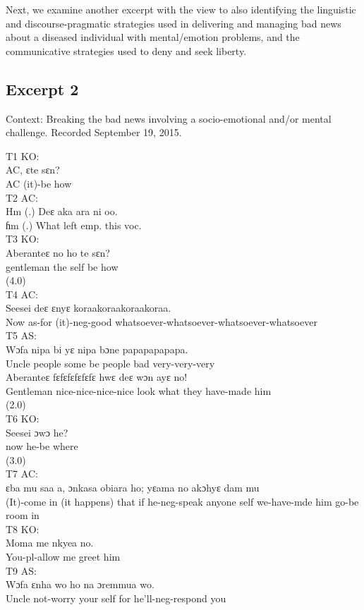 \documentclass[output=paper,colorlinks,citecolor=brown]{langscibook}
\begin{document}
Next, we examine another excerpt with the view to also identifying the linguistic and discourse-pragmatic strategies used in delivering and managing bad news about a diseased individual with mental/emotion problems, and the communicative strategies used to deny and seek liberty.

\subsection{Excerpt 2}\label{sec:obeng:4.2}
Context: Breaking the bad news involving a socio-emotional and/or mental challenge. Recorded September 19, 2015.

\ea
    T1 KO:\\
    \gll    AC, ɛte sɛn?\\
            AC (it)-be how \\
\ex
    T2 AC:\\
    \gll    Hm (.) Deɛ aka ara ni oo. \\
            ɦm (.) What left emp. this voc.\\
\ex
    T3 KO:\\ 
    \gll    Aberanteɛ no ho te sɛn? \\
            gentleman the self be how\\
            (4.0)\\
\ex
    T4 AC:\\
    \gll    Seesei deɛ ɛnyɛ koraakoraakoraakoraa. \\
            Now as-for (it)-neg-good whatsoever-whatsoever-whatsoever-whatsoever\\
\ex
    T5 AS:\\
    \ea
    \gll    Wɔfa nipa bi yɛ nipa bɔne papapapapapa. \\
            Uncle people some be people bad very-very-very \\
    \ex
    \gll    Aberanteɛ fɛfɛfɛfɛfɛfɛ hwɛ deɛ wɔn ayɛ no! \\
            Gentleman nice-nice-nice-nice look what they have-made him \\
            (2.0)\\
    \z
\ex
    T6 KO:\\
    \gll    Seesei ɔwɔ he? \\
            now he-be where \\
            (3.0)\\
\ex
    T7 AC:\\
    \gll    ɛba mu saa a, ɔnkasa obiara ho; yɛama no akɔhyɛ dam mu \\
            (It)-come in (it happens) that if he-neg-speak anyone self we-have-mde him go-be room in \\
\ex
    T8 KO:\\
    \gll    Moma me nkyea no. \\
            You-pl-allow me greet him \\
\ex
    T9 AS:\\
    \gll    Wɔfa ɛnha wo ho na ɔremmua wo. \\
            Uncle not-worry your self for he’ll-neg-respond you \\
\z
\end{document}
